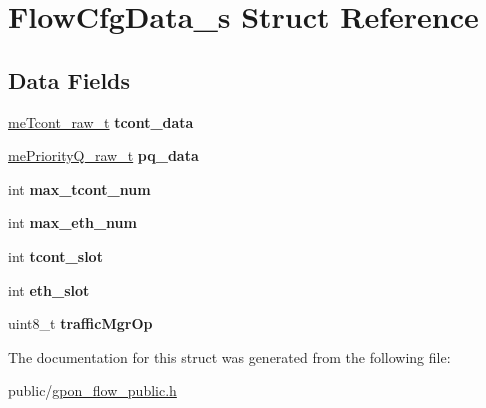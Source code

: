 \hypertarget{structFlowCfgData__s}{}\section{Flow\+Cfg\+Data\+\_\+s Struct Reference}
\label{structFlowCfgData__s}
\subsection*{Data Fields}
\begin{DoxyCompactItemize}
\item 
\mbox{\label{structFlowCfgData__s_a45262e1d02b7f85a6723fd4744fc9118}} 
\hyperlink{structmeTcont__raw__s}{me\+Tcont\+\_\+raw\+\_\+t} {\bfseries tcont\+\_\+data}
\item 
\mbox{\label{structFlowCfgData__s_a0cffbebb987f01ac0e9fa69b605e0651}} 
\hyperlink{structmePriorityQ__raw__s}{me\+Priority\+Q\+\_\+raw\+\_\+t} {\bfseries pq\+\_\+data}
\item 
\mbox{\label{structFlowCfgData__s_abf3548d7402f9077ec0f5a6079af32c2}} 
int {\bfseries max\+\_\+tcont\+\_\+num}
\item 
\mbox{\label{structFlowCfgData__s_ac58d6ea2a5dfd8c9b11784528b375745}} 
int {\bfseries max\+\_\+eth\+\_\+num}
\item 
\mbox{\label{structFlowCfgData__s_aec2146c7e2f9ba054c7ece6452888043}} 
int {\bfseries tcont\+\_\+slot}
\item 
\mbox{\label{structFlowCfgData__s_aeb449b511c1533d9043d36d58916dd3e}} 
int {\bfseries eth\+\_\+slot}
\item 
\mbox{\label{structFlowCfgData__s_a02016885de8f533fd70dac1ecdc6aecc}} 
uint8\+\_\+t {\bfseries traffic\+Mgr\+Op}
\end{DoxyCompactItemize}


The documentation for this struct was generated from the following file\+:\begin{DoxyCompactItemize}
\item 
public/\hyperlink{gpon__flow__public_8h}{gpon\+\_\+flow\+\_\+public.\+h}\end{DoxyCompactItemize}
